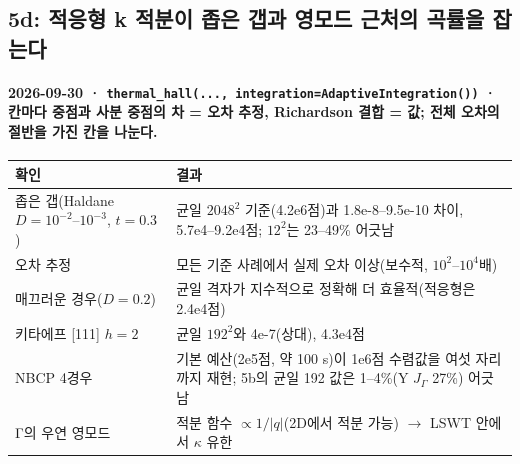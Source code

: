 \subsection{5d: 적응형 k 적분이 좁은 갭과 영모드 근처의 곡률을 잡는다}\label{stage5d}
\begingroup%
  \framesubtitle{2026-09-30 · \texttt{thermal\_hall(..., integration=AdaptiveIntegration())} · 칸마다 중점과 사분 중점의 차 = 오차 추정, Richardson 결합 = 값; 전체 오차의 절반을 가진 칸을 나눈다.}
  \footnotesize\renewcommand{\arraystretch}{1.06}
  \begin{tabularx}{\textwidth}{@{}P{3.3cm}Y@{}}
    \toprule
    확인 & 결과 \\
    \midrule
    좁은 갭(Haldane $D=10^{-2}$--$10^{-3}$, $t=0.3$) & 균일 $2048^2$ 기준(4.2e6점)과 1.8e-8--9.5e-10 차이, 5.7e4--9.2e4점; $12^2$는 23--49\% 어긋남 \\
    오차 추정 & 모든 기준 사례에서 실제 오차 이상(보수적, $10^2$--$10^4$배) \\
    매끄러운 경우($D=0.2$) & 균일 격자가 지수적으로 정확해 더 효율적(적응형은 2.4e4점) \\
    키타에프 [111] $h=2$ & 균일 $192^2$와 4e-7(상대), 4.3e4점 \\
    NBCP 4경우 & 기본 예산(2e5점, 약 100 s)이 1e6점 수렴값을 여섯 자리까지 재현; 5b의 균일 192 값은 1--4\%(Y $J_\Gamma$ 27\%) 어긋남 \\
    Γ의 우연 영모드 & 적분 함수 $\propto1/|q|$(2D에서 적분 가능) $\to$ LSWT 안에서 $\kappa$ 유한 \\
    \bottomrule
  \end{tabularx}
  \par\smallskip
\endgroup


